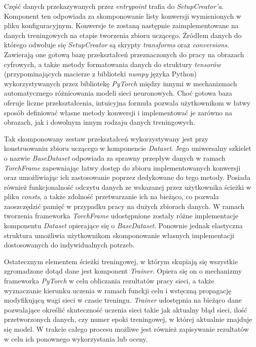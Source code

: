     Część danych przekazywanych przez \textit{entrypoint} trafia do \textit{SetupCreator'a}. Komponent
    ten odpowiada za skomponowanie listy konwersji wymienionych w pliku
    konfiguracyjnym. Konwersje te zostaną następnie zaimplementowane na danych treningowych
    na etapie tworzenia zbioru uczącego. Źródłem danych do którego odwołuje się
    \textit{SetupCreator} są skrypty \textit{transforms} oraz \textit{conversions}. Zawierają one gotową bazę
    przekształceń przeznaczonych do pracy na obrazach cyfrowych, a także metody
    formatowania danych do struktury \textit{tensorów} (przypominających macierze z biblioteki \textit{numpy}
    języka Python) wykorzystywanych przez bibliotekę \textit{PyTorch} między innymi w mechanizmach
    automatycznego różnicowania modeli sieci neuronowych. Choć gotowa baza oferuje
    liczne przekształcenia, intuicyjna formuła pozwala użytkownikom w łatwy sposób definiować
    własne metody konwersji i implementować je zarówno na obrazach, jak i dowolnym innym
    rodzaju danych treningowych.

    Tak skomponowany zestaw przekształceń wykorzystywany jest przy konstruowaniu zbioru
    uczącego w komponencie \textit{Dataset}. Jego uniwersalny szkielet o nazwie \textit{BaseDataset}
    odpowiada za sprawny przepływ danych w ramach \textit{TorchFrame} zapewniając łatwy dostęp
    do zbioru implementowanych konwersji oraz umożliwiając ich zastosowanie poprzez dedykowane
    do tego metody. Posiada również funkcjonalność odczytu danych ze wskazanej przez
    użytkownika ścieżki w pliku \textit{consts}, a także zdolność przetwarzanie ich na bieżąco, co pozwala
    zaoszczędzić pamięć w przypadku pracy na dużych zbiorach danych. W ramach tworzenia
    frameworka \textit{TorchFrame} udostępnione zostały różne implementacje komponentu \textit{Dataset} opierające się o
    \textit{BaseDataset}. Ponownie jednak elastyczna struktura umożliwia użytkownikom
    skomponowanie własnych implementacji dostosowanych do indywidualnych potrzeb.

    Ostatecznym elementem ścieżki treningowej, w którym skupiają się wszystkie
    zgromadzone dotąd dane jest komponent \textit{Trainer}. Opiera się on o mechanizmy
    frameworka \textit{PyTorch} w celu obliczania rezultatów pracy sieci, a także wyznaczanie
    kierunku uczenia w ramach funckji celu i wstęczną propagację modyfikującą wagi
    sieci w czasie treningu. \textit{Trainer} udostępnia na bieżąco dane pozwalające
    określić skuteczność uczenia sieci takie jak aktualny błąd sieci, ilość
    przetworzonych danych, czy numer epoki treningowej, w której aktualnie znajduje
    się model. W trakcie całego procesu możliwe jest również zapisywanie rezultatów
    w celu ich ponownego wykorzystania lub oceny.


